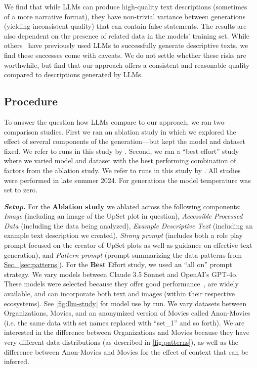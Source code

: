 \documentclass{egpubl}
\newcommand{\ie}{{i.e.}}
\newcommand{\secref}[1]{\hyperref[#1]{Sec.~\ref*{#1}}}
\newcommand{\parahead}[1]
{\vspace{0.25em}\noindent \textbf{\textit{#1.}}}
\begin{document}
We find that while LLMs can produce high-quality text descriptions (sometimes of a more narrative format), they have non-trivial variance between generations (yielding inconsistent quality) that can contain false statements. The results are also dependent on the presence of related data in the models' training set.
While others~\cite{duarte_autovizua11y_2024} have previously used LLMs to successfully generate descriptive texts, we find these successes come with caveats.
We do not settle whether these risks are worthwhile, but find that our approach offers a consistent and reasonable quality compared to descriptions generated by LLMs.





\subsection{Procedure}

To answer the question how LLMs compare to our approach, we ran two comparison studies.
First we ran an ablation study in which we explored the effect of several components of the generation---but kept the model and dataset fixed.
We refer to runs in this study by .
Second, we ran a ``best effort'' study where we varied model and dataset with the best performing combination of factors from the ablation study.
We refer to runs in this study by .
All studies were performed in late summer 2024.
For generations the model temperature was set to zero.

\parahead{Setup} For the \textbf{Ablation study} we ablated across the following components:
\emph{Image} (including an image of the UpSet plot in question),
\emph{Accessible Processed Data} (including the data being analyzed),
\emph{Example Descriptive Text} (including an example text description we created),
\emph{Strong prompt} (includes both a role play prompt focused on the creator of UpSet plots as well as guidance on effective text generation), and
\emph{Pattern prompt} (prompt summarizing the data patterns from \secref{sec:patterns}).
For the \textbf{Best} Effort study, we used an ``all on'' prompt strategy.
We vary models between Claude 3.5 Sonnet and OpenAI's GPT-4o. These models were selected because they offer good performance~\cite{kane_claude_2024}, are widely available, and can incorporate both text and images (within their respective ecosystems). See \autoref{fig:llm-study} for model use by run.
We vary datasets between Organizations, Movies, and an anonymized version of Movies called Anon-Movies  (\ie{} the same data with set names replaced with ``set\_1'' and so forth).
We are interested in the difference between Organizations and Movies because they have very different data distributions (as described in \autoref{fig:patterns}), as well as the difference between Anon-Movies and Movies for the effect of context that can be inferred.
\end{document}
